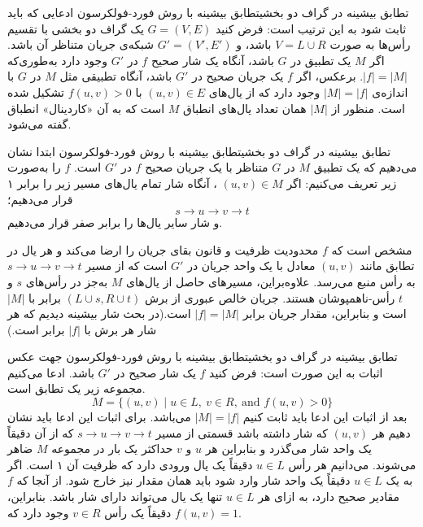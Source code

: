 \begin{itemframe-s}{تطابق بیشینه در گراف دو بخشی}{تطابق بیشینه با روش فورد-فولکرسون}
\itm
ادعایی که باید ثابت شود به این ترتیب است:
\itm
فرض کنید $G = (V, E)$ یک گراف دو بخشی با تقسیم رأس‌ها به صورت $V = L \cup R$ باشد، و $G' = (V', E')$ شبکه‌ی جریان متناظر آن باشد. اگر $M$ یک تطبیق در $G$ باشد، آنگاه یک شار صحیح $f$ در $G'$ وجود دارد به‌طوری‌که $|f| = |M|$.
\itm
 برعکس، اگر $f$ یک جریان صحیح در $G'$ باشد، آنگاه تطبیقی مثل $M$ در $G$ با اندازه‌ی
$|M| = |f|$
وجود دارد که از یال‌های $(u, v) \in E$ با
 $f(u, v) > 0$
 تشکیل شده است.
\itm
منظور از $|M|$ همان تعداد یال‌های انطباق $M$ است که به آن «کاردینال»
 انطباق گفته می‌شود.
\end{itemframe-s}


\begin{itemframe-s}{تطابق بیشینه در گراف دو بخشی}{تطابق بیشینه با روش فورد-فولکرسون}
\itm
ابتدا نشان می‌دهیم که یک تطبیق $M$ در $G$ متناظر با یک جریان صحیح $f$ در $G'$ است. $f$ را به‌صورت زیر تعریف می‌کنیم:
\itm
اگر
$(u, v) \in M$
، آنگاه شار تمام یال‌های مسیر زیر را برابر ۱ قرار می‌دهیم؛
$$s \to u \to v \to t$$
 و شار سایر یال‌ها را برابر صفر قرار می‌دهیم.
\itm

مشخص است که $f$ محدودیت ظرفیت و قانون بقای جریان را ارضا می‌کند و هر یال در تطابق مانند
$(u, v)$
معادل با یک واحد جریان در $G'$ است که از مسیر
$s \to u \to v \to t$
به رأس منبع می‌رسد. علاوه‌براین، مسیرهای حاصل از یال‌های $M$ به‌جز در رأس‌های $s$ و $t$ رأس‌-ناهمپوشان هستند.
\itm
 جریان خالص عبوری از برش
$(L \cup {s}, R \cup {t})$
برابر با $|M|$ است و بنابراین، مقدار جریان برابر
 $|f| = |M|$
 است.(در بحث شار بیشینه دیدیم که هر شار هر برش با $|f|$ برابر است.)
\end{itemframe-s}


\begin{itemframe-s}{تطابق بیشینه در گراف دو بخشی}{تطابق بیشینه با روش فورد-فولکرسون}
\itm
جهت عکس اثبات به این صورت است:
فرض کنید $f$ یک شار صحیح در $G'$ باشد. ادعا می‌کنیم مجموعه زیر یک تطابق است.
$$
M = \{ (u, v) \mid u \in L,\ v \in R,\ \text{and } f(u,v) > 0 \}
$$
بعد از اثبات این ادعا باید ثابت کنیم $|M| = |f|$ می‌باشد.
\itm
برای اثبات این ادعا باید نشان دهیم هر
$ (u, v) $
که شار داشته باشد قسمتی از مسیر
$s \to u \to v \to t$
که از آن دقیقاً یک واحد شار می‌گذرد و بنابراین هر $u$ و $v$ حداکثر یک بار در مجموعه $M$ ضاهر می‌شوند.
\itm
می‌دانیم هر رأس
 $u \in L$
دقیقاً یک یال ورودی دارد که ظرفیت آن ۱ است.
اگر به یک  $u \in L$  دقیقاً یک واحد شار وارد شود باید همان مقدار نیز خارج شود.
از آنجا که $f$ مقادیر صحیح دارد، به ازای هر $u \in L$ تنها یک یال می‌تواند دارای شار باشد. بنابراین، دقیقاً یک رأس $v \in R$ وجود دارد که
$f(u, v) = 1$.

\end{itemframe-s}


